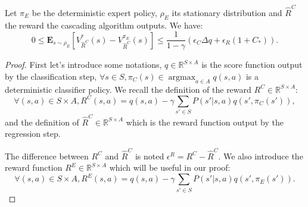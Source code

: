 \documentclass[smallextended]{svjour3}
\newcommand{\E}{\mathbf{E}}
\newcommand{\argmax}{\operatorname*{argmax}} %
\begin{document}
\begin{theorem}
\label{thm}
Let $\pi_E$ be the deterministic expert policy, $\rho_E$ its stationary distribution and $\hat{R}^C$ the reward the cascading algorithm outputs. We have:
\begin{equation}
0\leq\E_{s\sim\rho_E}[V^*_{\hat{R}^C}(s)-V^{\pi_E}_{\hat{R}^C}(s)]\leq \frac{1}{1-\gamma}\left(\epsilon_C\Delta q +\epsilon_R(1+C_*)\right).
\end{equation}
\end{theorem}
\begin{proof}
First let's introduce some notations, $q\in\mathbb{R}^{S\times A}$ is the score function output by the classification step, $\forall s \in S,\pi_C(s)\in\argmax_{a\in A}q(s,a)$ is a deterministic classifier policy. We recall the definition of the reward $R^C\in\mathbb{R}^{S\times A}$:
\begin{equation}
\forall (s,a)\in S\times A, R^C(s,a)=q(s,a) -\gamma\sum_{s'\in S}P(s'|s,a)q(s',\pi_C(s')),
\end{equation}
and the definition of $\hat{R}^C\in\mathbb{R}^{S\times A}$ which is the reward function output by the regression step.

The difference between $R^C$ and $\hat{R}^C$ is noted $\epsilon^R=R^C-\hat{R}^C$.
We also introduce the reward function $R^E\in\mathbb{R}^{S\times A}$ which will be useful in our proof:
\begin{equation}
\forall (s,a)\in S\times A, R^E(s,a)=q(s,a) -\gamma\sum_{s'\in S}P(s'|s,a)q(s',\pi_E(s')).
\end{equation}


\end{proof}
\end{document}
